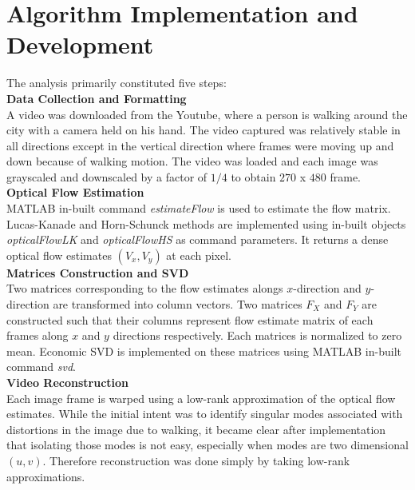 \documentclass{article}
\begin{document}
\section{Algorithm Implementation and Development}\label{Algorithm}
The analysis primarily constituted five steps: \\

\textbf{Data Collection and Formatting} \\
A video was downloaded from the Youtube, where a person is walking around the city with a camera held on his hand. The video captured was relatively stable in all directions except in the vertical direction where frames were moving up and down because of walking motion. The video was loaded and each image was grayscaled and downscaled by a factor of $1/4$ to obtain $270$ x $480$ frame. \\

\textbf{Optical Flow Estimation} \\
MATLAB in-built command \emph{estimateFlow} is used to estimate the flow matrix. Lucas-Kanade and Horn-Schunck methods are implemented using in-built objects \emph{opticalFlowLK} and \emph{opticalFlowHS} as command parameters. It returns a dense optical flow estimates $(V_x, V_y)$ at each pixel. \\

\textbf{Matrices Construction and SVD}\\
Two matrices corresponding to the flow estimates alongs $x$-direction and $y$-direction are transformed into column vectors. Two matrices $F_X$ and $F_Y$ are constructed such that their columns represent flow estimate matrix of each frames along $x$ and $y$ directions respectively. Each matrices is normalized to zero mean. Economic SVD is implemented on these matrices using MATLAB in-built command \emph{svd}. \\

\textbf{Video Reconstruction} \\
Each image frame is warped using a low-rank approximation of the optical flow estimates. While the initial intent was to identify singular modes associated with distortions in the image due to walking, it became clear after implementation that isolating those modes is not easy, especially when modes are two dimensional $(u,v)$. Therefore reconstruction was done simply by taking low-rank approximations.


\end{document}
